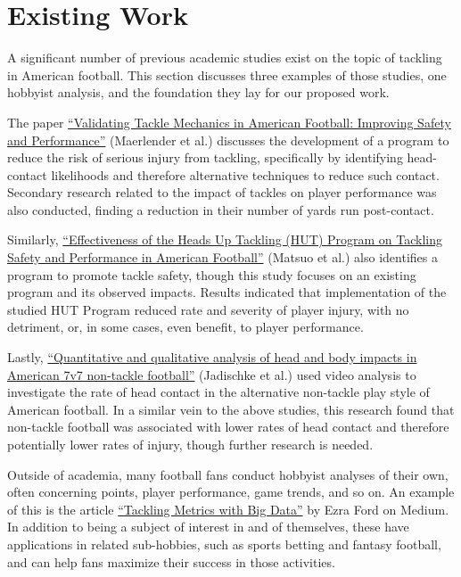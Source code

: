\documentclass[sigconf, hyperref={colorlinks=true,linkcolor=blue,urlcolor=blue}]{acmart}
\begin{document}
\section{Existing Work}
A significant number of previous academic studies exist on the topic of
tackling in American football. This section discusses three examples of those
studies, one hobbyist analysis, and the foundation they lay for our proposed
work.

The paper \href{https://link.springer.com/article/10.1007/s10439-020-02625-7}{“Validating Tackle
Mechanics in American Football: Improving Safety and Performance”} (Maerlender et al.) discusses the
development of a program to reduce the risk of serious injury from tackling, specifically by identifying
head-contact likelihoods and therefore alternative techniques to reduce such contact. Secondary research
related to the impact of tackles on player performance was also conducted, finding a reduction in
their number of yards run post-contact.

Similarly, \href{https://www.jstage.jst.go.jp/article/ijshs/16/0/16_201804/_article/-char/ja/}
{“Effectiveness of the Heads Up Tackling (HUT) Program on Tackling Safety and Performance in American Football”}
(Matsuo et al.) also identifies a program to promote tackle safety, though this study focuses
on an existing program and its observed impacts. Results indicated that implementation of the
studied HUT Program reduced rate and severity of player injury, with no detriment, or, in some
cases, even benefit, to player performance.

Lastly, \href{https://bmjopensem.bmj.com/content/6/1/e000638.abstract}{“Quantitative and qualitative
analysis of head and body impacts in American 7v7 non-tackle football”} (Jadischke et al.) used video
analysis to investigate the rate of head contact in the alternative non-tackle play style of
American football. In a similar vein to the above studies, this research found that non-tackle
football was associated with lower rates of head contact and therefore potentially lower rates of
injury, though further research is needed.

Outside of academia, many football fans conduct hobbyist analyses of their own, often
concerning points, player performance, game trends, and so on. An example of this is
the article \href{https://medium.com/@ezra.ford/tackling-metrics-with-big-data-0812b5ab65f0}{“Tackling Metrics with Big Data”}
by Ezra Ford on Medium. In addition to being a subject of interest in and of themselves,
these have applications in related sub-hobbies, such as sports betting and fantasy football,
and can help fans maximize their success in those activities.
\end{document}
